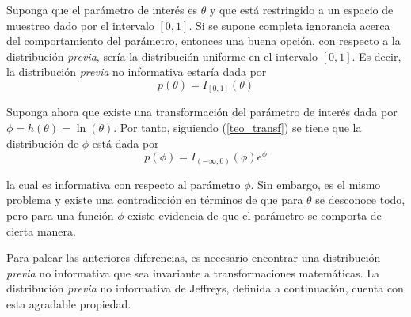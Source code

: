 \documentclass[10pt,openright]{book}\usepackage[]{graphicx}\usepackage[]{color}
\begin{document}
\begin{Eje}
Suponga que el parámetro de interés es $\theta$ y que está restringido a un espacio de muestreo dado por el intervalo $[0,1]$. Si se supone completa ignorancia acerca del comportamiento del parámetro, entonces una buena opción, con respecto a la distribución \emph{previa}, sería la distribución uniforme en el intervalo $[0,1]$. Es decir, la distribución \emph{previa} no informativa estaría dada por
\begin{equation*}
p(\theta) = I_{[0,1]}(\theta)
\end{equation*}

Suponga ahora que existe una transformación del parámetro de interés dada por $\phi=h(\theta)=\ln(\theta)$. Por tanto, siguiendo (\ref{teo_transf}) se tiene que la distribución de $\phi$ está dada por
\begin{equation*}
p(\phi)=I_{(-\infty,0)}(\phi)e^{\phi}
\end{equation*}

la cual es informativa con respecto al parámetro $\phi$. Sin embargo, es el mismo problema y existe una contradicción en términos de que para $\theta$ se desconoce todo, pero para una función $\phi$ existe evidencia de que el parámetro se comporta de cierta manera.
\end{Eje}

Para palear las anteriores diferencias, es necesario encontrar una distribución \emph{previa} no informativa que sea invariante a transformaciones matemáticas. La distribución \emph{previa} no informativa de Jeffreys, definida a continuación, cuenta con esta agradable propiedad.
\end{document}
